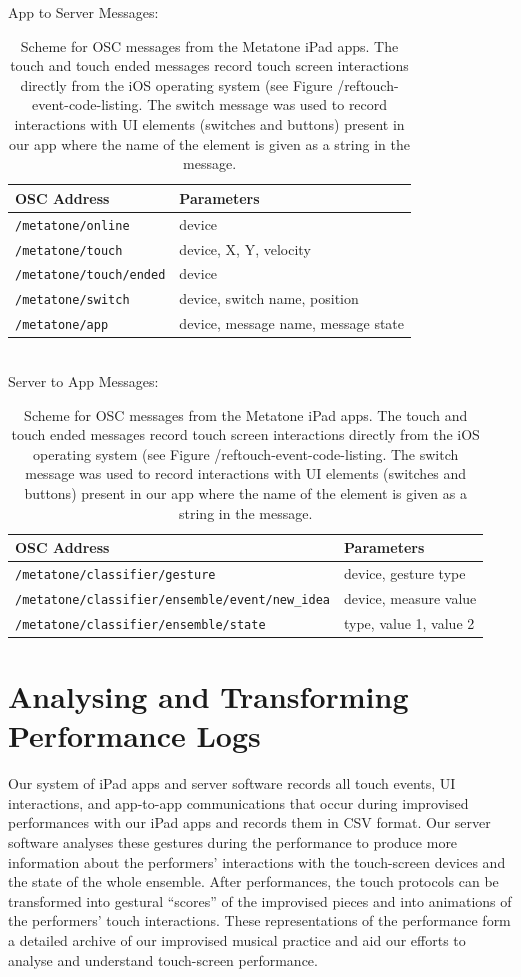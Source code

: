 \documentclass[graybox]{svmult}
\begin{document}
\begin{table}
  \begin{center}
  App to Server Messages:\\

  \begin{tabular}{|l|l|}
  \hline
  OSC Address           & Parameters \\ 
  \hline
  \texttt{/metatone/online}      & device  \\     
  \texttt{/metatone/touch}       & device, X, Y, velocity \\
  \texttt{/metatone/touch/ended} & device \\  
  \texttt{/metatone/switch}      & device, switch name, position\\
  \texttt{/metatone/app}         & device, message name, message state\\
  \hline
  \end{tabular}\\
  Server to App Messages:\\
  \begin{tabular}{|l|l|}
  \hline
  OSC Address           & Parameters \\ \hline
  \texttt{/metatone/classifier/gesture} & device, gesture type\\
  \texttt{/metatone/classifier/ensemble/event/new\_idea} & device, measure value\\
  \texttt{/metatone/classifier/ensemble/state} & type, value 1, value 2 \\
  \hline
  \end{tabular}
\end{center}
  \caption{Scheme for OSC messages from the Metatone iPad apps. The
    touch and touch ended messages record touch screen interactions
    directly from the iOS operating system (see Figure /ref{touch-event-code-listing}. The
    switch message was used to record interactions with UI elements
    (switches and buttons) present in our app where the name of the
    element is given as a string in the message.}
  \label{oscschema} 
\end{table}

\section{Analysing and Transforming Performance Logs}
\label{sec:analysis}

Our system of iPad apps and server software records all touch events,
UI interactions, and app-to-app communications that occur during
improvised performances with our iPad apps and records them in CSV
format. Our server software analyses these gestures during the
performance to produce more information about the performers'
interactions with the touch-screen devices and the state of the whole
ensemble. After performances, the touch protocols can be transformed
into gestural ``scores'' of the improvised pieces and into animations
of the performers' touch interactions. These representations of the
performance form a detailed archive of our improvised musical practice
and aid our efforts to analyse and understand touch-screen performance.
\end{document}
